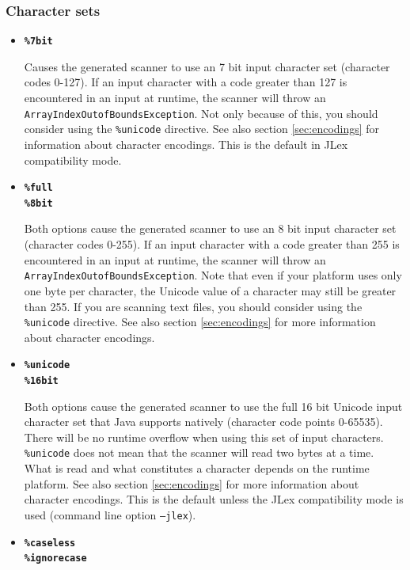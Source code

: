 \documentclass[11pt]{scrartcl}
\begin{document}
\subsubsection{Character sets\label{CharacterSets}}
\begin{itemize}
\item
{\bf \texttt{\%7bit}}

Causes the generated scanner to use an 7 bit input character set (character
codes 0-127). If an input character with a code greater than 127 is
encountered in an input at runtime, the scanner will throw an \texttt{ArrayIndexOutofBoundsException}.
Not only because of this, you should consider using the \texttt{\%unicode} directive. 
See also section \ref{sec:encodings} for information about character encodings. This is the default in JLex compatibility mode.
 
\item
{\bf \texttt{\%full}}\\
{\bf \texttt{\%8bit}}

Both options cause the generated scanner to use an 8 bit input character
set (character codes 0-255). If an input character with a code greater
than 255 is encountered in an input at runtime, the scanner will throw
an \texttt{ArrayIndexOutofBoundsException}. Note that even if your platform
uses only one byte per character, the Unicode value of a character may
still be greater than 255. If you are scanning text files, you should
consider using the \texttt{\%unicode} directive. See also section \ref{sec:encodings}
for more information about character encodings.
 
\item
{\bf \texttt{\%unicode}}\\
{\bf \texttt{\%16bit}}

Both options cause the generated scanner to use the full 16 bit Unicode input
character set that Java supports natively (character code points 0-65535).
There will be no runtime overflow when using this set of input characters.
\texttt{\%unicode} does not mean that the scanner will read two bytes at a
time. What is read and what constitutes a character depends on the runtime
platform. See also section \ref{sec:encodings} for more information about
character encodings. This is the default unless the JLex compatibility mode is
used (command line option \texttt{--jlex}).

\label{caseless} \item {\bf \texttt{\%caseless}}\\ {\bf \texttt{\%ignorecase}}


\end{itemize}
\end{document}
